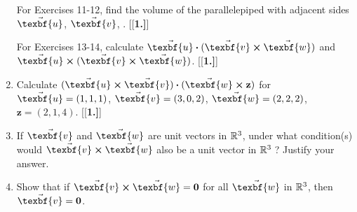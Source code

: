 \begin{enumerate}[\bfseries 1.]
\par\noindent For Exercises 11-12, find the volume of the parallelepiped with adjacent sides $\vec{\texbf{u}}$,
$\vec{\texbf{v}}$, .
[{[\bfseries 1.]}]
\par\noindent For Exercises 13-14, calculate $\Dotprod{\vec{\texbf{u}}}{(\Crossprod{\vec{\texbf{v}}}{\vec{\texbf{w}}})}$ and
$\Crossprod{\vec{\texbf{u}}}{(\Crossprod{\vec{\texbf{v}}}{\vec{\texbf{w}}})}$.
[{[\bfseries 1.]}]
 \item Calculate $\Dotprod{(\Crossprod{\vec{\texbf{u}}}{\vec{\texbf{v}}})}{(\Crossprod{\vec{\texbf{w}}}{\textbf{z}})}$ for
 $\vec{\texbf{u}} = (1,1,1)$, $\vec{\texbf{v}} = (3,0,2)$, $\vec{\texbf{w}} = (2,2,2)$, $\textbf{z} = (2,1,4)$.
[{[\bfseries 1.]}]
 \item If $\vec{\texbf{v}}$ and $\vec{\texbf{w}}$ are unit vectors in $\mathbb{R}^{3}$, under what condition(s) would
  $\Crossprod{\vec{\texbf{v}}}{\vec{\texbf{w}}}$ also be a unit vector in $\mathbb{R}^{3}\;$? Justify your answer.
 \item Show that if $\Crossprod{\vec{\texbf{v}}}{\vec{\texbf{w}}} = \textbf{0}$ for all $\vec{\texbf{w}}$ in $\mathbb{R}^{3}$, then
  $\vec{\texbf{v}} = \textbf{0}$.
\end{enumerate}
